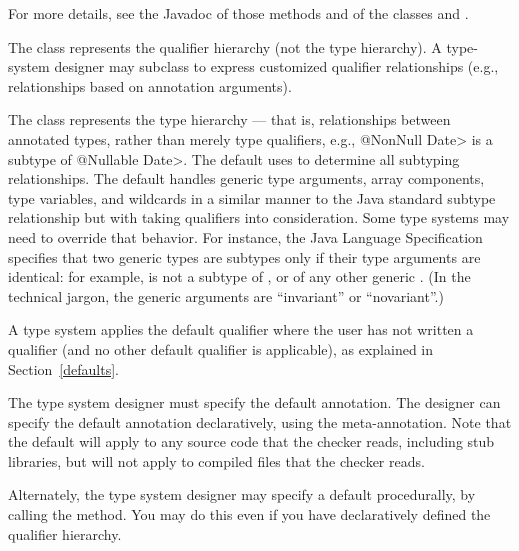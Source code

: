 For more details, see the Javadoc of those methods and of the classes
 and .

The  class represents the qualifier hierarchy (not the
type hierarchy).  A type-system designer may subclass
 to express customized qualifier
relationships (e.g., relationships based on annotation
arguments).

The  class represents the type hierarchy ---
that is, relationships between
annotated types, rather than merely type qualifiers, e.g., \<@NonNull
Date> is a subtype of \<@Nullable Date>.  The default  uses
 to determine all subtyping relationships.
The default  handles
generic type arguments, array components, type variables, and
wildcards in a similar manner to the Java standard subtype
relationship but with taking qualifiers into consideration.  Some type
systems may need to override that behavior.  For instance, the Java
Language Specification specifies that two generic types are subtypes only
if their type arguments are identical:  for example,
 is not a subtype of , or of any other
generic .
(In the technical jargon, the generic arguments are ``invariant'' or ``novariant''.)



A type system applies the default qualifier where the user has not written a
qualifier (and no other default qualifier is applicable), as explained in
Section~\ref{defaults}.

The type system designer must specify the default annotation. The designer can specify the default annotation declaratively,
using the 
meta-annotation.
Note that the default will apply to any source code that the checker reads,
including stub libraries, but will not apply to compiled 
files that the checker reads.

\begin{sloppypar}
Alternately, the type system designer may specify a default procedurally,
by calling the
method.  You may do this even if you have declaratively defined the
qualifier hierarchy.
\end{sloppypar}

